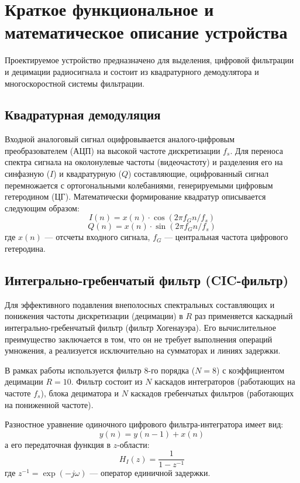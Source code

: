 
\section{Краткое функциональное и математическое описание устройства}

Проектируемое устройство предназначено для выделения, цифровой фильтрации и децимации радиосигнала и состоит из квадратурного демодулятора и многоскоростной системы фильтрации.

\subsection{Квадратурная демодуляция}
Входной аналоговый сигнал оцифровывается аналого-цифровым преобразователем (АЦП) на высокой частоте дискретизации $f_s$. Для переноса спектра сигнала на околонулевые частоты (видеочастоту) и разделения его на синфазную ($I$) и квадратурную ($Q$) составляющие, оцифрованный сигнал перемножается с ортогональными колебаниями, генерируемыми цифровым гетеродином (ЦГ). 
Математически формирование квадратур описывается следующим образом:
\begin{equation}
    I(n) = x(n) \cdot \cos(2\pi f_G n / f_s)
\end{equation}
\begin{equation}
    Q(n) = x(n) \cdot \sin(2\pi f_G n / f_s)
\end{equation}
где $x(n)$ — отсчеты входного сигнала, $f_G$ — центральная частота цифрового гетеродина.

\subsection{Интегрально-гребенчатый фильтр (CIC-фильтр)}
Для эффективного подавления внеполосных спектральных составляющих и понижения частоты дискретизации (децимации) в $R$ раз применяется каскадный интегрально-гребенчатый фильтр (фильтр Хогенауэра). Его вычислительное преимущество заключается в том, что он не требует выполнения операций умножения, а реализуется исключительно на сумматорах и линиях задержки.

В рамках работы используется фильтр 8-го порядка ($N=8$) с коэффициентом децимации $R=10$. Фильтр состоит из $N$ каскадов интеграторов (работающих на частоте $f_s$), блока дециматора и $N$ каскадов гребенчатых фильтров (работающих на пониженной частоте).

Разностное уравнение одиночного цифрового фильтра-интегратора имеет вид:
\begin{equation}
    y(n) = y(n-1) + x(n)
\end{equation}
а его передаточная функция в $z$-области:
\begin{equation}
    H_I(z) = \frac{1}{1 - z^{-1}}
\end{equation}
где $z^{-1} = \exp(-j\omega)$ — оператор единичной задержки.

